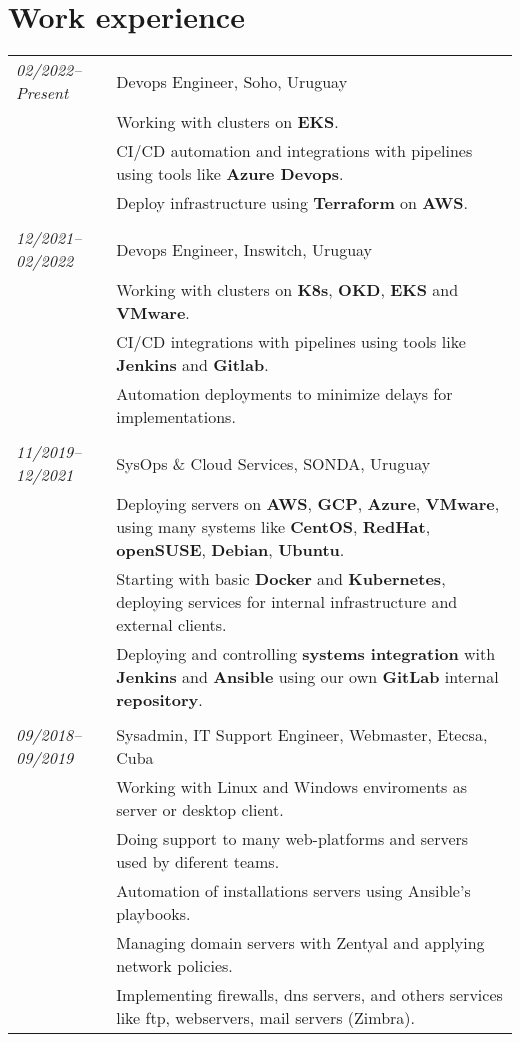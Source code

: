 \documentclass[a4paper,12pt]{article}
\begin{document}
\section{Work experience}
\begin{tabular}{p{2.9cm}| p{16cm}}
\emph{02/2022–Present} & Devops Engineer, Soho, Uruguay \\
\textsc{}&\footnotesize{Working with clusters on \textbf{EKS}.}\\
\textsc{}&\footnotesize{CI/CD automation and integrations with pipelines using tools like \textbf{Azure Devops}.}\\
\textsc{}&\footnotesize{Deploy infrastructure using \textbf{Terraform} on \textbf{AWS}.}\\

\multicolumn{2}{c}{} \\  
\emph{12/2021–02/2022} & Devops Engineer, Inswitch, Uruguay \\
\textsc{}&\footnotesize{Working with clusters on \textbf{K8s}, \textbf{OKD}, \textbf{EKS} and \textbf{VMware}.}\\
\textsc{}&\footnotesize{CI/CD integrations with pipelines using tools like \textbf{Jenkins} and \textbf{Gitlab}.}\\
\textsc{}&\footnotesize{Automation deployments to minimize delays for implementations.}\\

\multicolumn{2}{c}{} \\  
\emph{11/2019–12/2021} & SysOps \& Cloud Services, SONDA, Uruguay \\
\textsc{}&\footnotesize{Deploying servers on \textbf{AWS}, \textbf{GCP}, \textbf{Azure}, \textbf{VMware}, using many systems like \textbf{CentOS}, \textbf{RedHat}, \textbf{openSUSE}, \textbf{Debian}, \textbf{Ubuntu}.}\\
\textsc{}&\footnotesize{Starting with basic \textbf{Docker} and \textbf{Kubernetes}, deploying services for internal infrastructure and external clients.}\\
\textsc{}&\footnotesize{Deploying and controlling \textbf{systems integration} with \textbf{Jenkins} and \textbf{Ansible} using our own \textbf{GitLab} internal \textbf{repository}.}\\

\multicolumn{2}{c}{} \\  
\emph{09/2018–09/2019} & Sysadmin, IT Support Engineer, Webmaster, Etecsa, Cuba\\
\textsc{}&\footnotesize{Working with Linux and Windows enviroments as server or desktop client.}\\
\textsc{}&\footnotesize{Doing support to many web-platforms and servers used by diferent teams.}\\
\textsc{}&\footnotesize{Automation of installations servers using Ansible's playbooks.}\\
\textsc{}&\footnotesize{Managing domain servers with Zentyal and applying network policies.}\\
\textsc{}&\footnotesize{Implementing firewalls, dns servers, and others services like ftp, webservers, mail servers (Zimbra).}\\


\end{tabular}
\end{document}
